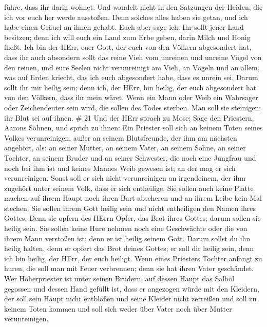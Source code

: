 führe, dass ihr darin wohnet.  Und wandelt nicht in den
Satzungen der Heiden, die ich vor euch her werde ausstoßen. Denn solches
alles haben sie getan, und ich habe einen Gräuel an ihnen gehabt.
 Euch aber sage ich: Ihr sollt jener Land besitzen; denn
ich will euch ein Land zum Erbe geben, darin Milch und Honig fließt. Ich
bin der HErr, euer Gott, der euch von den Völkern abgesondert hat,
 dass ihr auch absondern sollt das reine Vieh vom unreinen
und unreine Vögel von den reinen, und eure Seelen nicht verunreinigt am
Vieh, an Vögeln und an allem, was auf Erden kriecht, das ich euch
abgesondert habe, dass es unrein sei.  Darum sollt ihr mir
heilig sein; denn ich, der HErr, bin heilig, der euch abgesondert hat
von den Völkern, dass ihr mein wäret.  Wenn ein Mann oder
Weib ein Wahrsager oder Zeichendeuter sein wird, die sollen des Todes
sterben. Man soll sie steinigen; ihr Blut sei auf ihnen. \# 21
 Und der HErr sprach zu Mose: Sage den Priestern, Aarons
Söhnen, und sprich zu ihnen: Ein Priester soll sich an keinem Toten
seines Volkes verunreinigen,  außer an seinem Blutsfreunde,
der ihm am nächsten angehört, als: an seiner Mutter, an seinem Vater, an
seinem Sohne, an seiner Tochter, an seinem Bruder  und an
seiner Schwester, die noch eine Jungfrau und noch bei ihm ist und keines
Mannes Weib gewesen ist; an der mag er sich verunreinigen. 
Sonst soll er sich nicht verunreinigen an irgendeinem, der ihm zugehört
unter seinem Volk, dass er sich entheilige.  Sie sollen auch
keine Platte machen auf ihrem Haupt noch ihren Bart abscheren und an
ihrem Leibe kein Mal stechen.  Sie sollen ihrem Gott heilig
sein und nicht entheiligen den Namen ihres Gottes. Denn sie opfern des
HErrn Opfer, das Brot ihres Gottes; darum sollen sie heilig sein.
 Sie sollen keine Hure nehmen noch eine Geschwächte oder die
von ihrem Mann verstoßen ist; denn er ist heilig seinem Gott.
 Darum sollst du ihn heilig halten, denn er opfert das Brot
deines Gottes; er soll dir heilig sein, denn ich bin heilig, der HErr,
der euch heiligt.  Wenn eines Priesters Tochter anfängt zu
huren, die soll man mit Feuer verbrennen; denn sie hat ihren Vater
geschändet.  Wer Hoherpriester ist unter seinen Brüdern,
auf dessen Haupt das Salböl gegossen und dessen Hand gefüllt ist, dass
er angezogen würde mit den Kleidern, der soll sein Haupt nicht entblößen
und seine Kleider nicht zerreißen  und soll zu keinem Toten
kommen und soll sich weder über Vater noch über Mutter verunreinigen.
